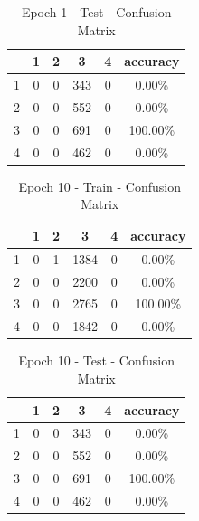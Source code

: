 \begin{table}[H]
\centering
\begin{tabular}{l|c|c|c|c|c}
{}	& 1	& 2		& 3		& 4		& accuracy 	\\ \hline
{1} & 0	& 0		& 343	& 0		& 0.00\%	\\ \hline                     
{2} & 0	& 0		& 552	& 0		& 0.00\%	\\ \hline                 
{3} & 0	& 0		& 691	& 0		& 100.00\%	\\ \hline
{4} & 0	& 0		& 462	& 0		& 0.00\%	\\ \hline
\end{tabular}
\caption{Epoch 1 - Test - Confusion Matrix}
\label{table:ts-ep1}
\end{table}

\begin{table}[H]
\centering
\begin{tabular}{l|c|c|c|c|c}
{}	& 1	& 2		& 3		& 4		& accuracy 	\\ \hline
{1} & 0	& 1		& 1384	& 0		& 0.00\%	\\ \hline                     
{2} & 0	& 0		& 2200	& 0		& 0.00\%	\\ \hline                 
{3} & 0	& 0		& 2765	& 0		& 100.00\%	\\ \hline
{4} & 0	& 0		& 1842	& 0		& 0.00\%	\\ \hline
\end{tabular}
\caption{Epoch 10 - Train - Confusion Matrix}
\label{table:ts-ep1}
\end{table}

\begin{table}[H]
\centering
\begin{tabular}{l|c|c|c|c|c}
{}	& 1	& 2		& 3		& 4		& accuracy 	\\ \hline
{1} & 0	& 0		& 343	& 0		& 0.00\%	\\ \hline                     
{2} & 0	& 0		& 552	& 0		& 0.00\%	\\ \hline                 
{3} & 0	& 0		& 691	& 0		& 100.00\%	\\ \hline
{4} & 0	& 0		& 462	& 0		& 0.00\%	\\ \hline
\end{tabular}
\caption{Epoch 10 - Test - Confusion Matrix}
\label{table:ts-ep1}
\end{table}
\newpage





